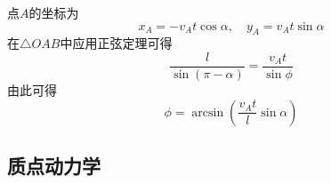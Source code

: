 \begin{solution}
点$A$的坐标为
\begin{equation*}
	x_A = -v_A t \cos \alpha,\quad y_A = v_A t \sin \alpha
\end{equation*}
在$\triangle OAB$中应用正弦定理可得
\begin{equation*}
	\frac{l}{\sin(\pi-\alpha)} = \frac{v_A t}{\sin \phi}
\end{equation*}
由此可得
\begin{equation*}
	\phi = \arcsin\left(\frac{v_A t}{l} \sin \alpha\right)
\end{equation*}
\end{solution}

\subsection{质点动力学}

